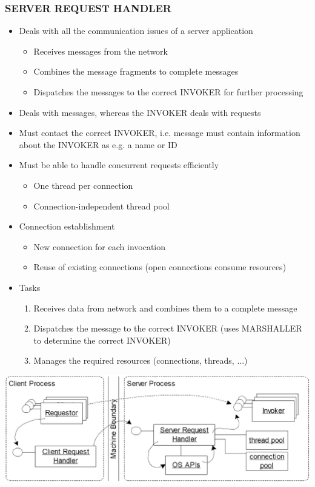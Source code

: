 \documentclass[10pt]{article}
\begin{document}
\subsubsection{SERVER REQUEST HANDLER}
\begin{itemize}
	\item Deals with all the communication issues of a server application
		\begin{itemize}
			\item Receives messages from the network
			\item Combines the message fragments to complete messages
			\item Dispatches the messages to the correct INVOKER for further processing
		\end{itemize}
	\item Deals with messages, whereas the INVOKER deals with requests
	\item Must contact the correct INVOKER, i.e. message must contain information about the INVOKER as e.g. a name or ID
	\item Must be able to handle concurrent requests efficiently
		\begin{itemize}
			\item One thread per connection
			\item Connection-independent thread pool
		\end{itemize}
	\item Connection establishment
		\begin{itemize}
			\item New connection for each invocation
			\item Reuse of existing connections (open connections consume resources)		
		\end{itemize}
	\item Tasks
		\begin{enumerate}
			\item Receives data from network and combines them to a complete message
			\item Dispatches the message to the correct INVOKER (uses MARSHALLER to determine the correct INVOKER)
			\item Manages the required resources (connections, threads, ...)
		\end{enumerate}
\end{itemize}
\begin{center}
	\includegraphics[scale=0.2]{images/server-request-handler.png}
\end{center}
\end{document}
